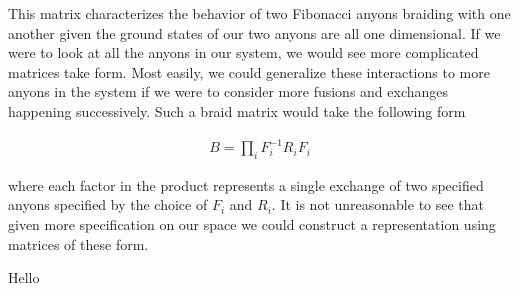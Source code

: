 \documentclass[10pt]{ucthesis}
\begin{document}
This matrix characterizes the behavior of two Fibonacci anyons braiding with one another given the ground states of our two anyons are all one dimensional. If we were to look at all the anyons in our system, we would see more complicated matrices take form. Most easily, we could generalize these interactions to more anyons in the system if we were to consider more fusions and exchanges happening successively. Such a braid matrix would take the following form

\begin{equation}
	\begin{aligned}
		B = \prod_i F_i^{-1}R_iF_i
	\end{aligned}
\end{equation}

where each factor in the product represents a single exchange of two specified anyons specified by the choice of $F_i$ and $R_i$. It is not unreasonable to see that given more specification on our space we could construct a representation using matrices of these form.







\newpage
Hello














\clearpage

%
%
\end{document}
